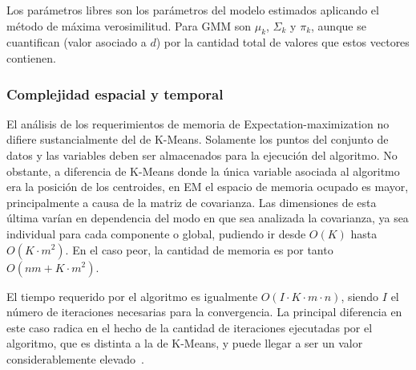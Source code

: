 Los parámetros libres son los parámetros del modelo estimados aplicando el método de máxima verosimilitud.
Para GMM son $\mu_k$, $\Sigma_k$ y $\pi_k$, aunque se cuantifican (valor asociado a $d$) por la cantidad total de valores que estos vectores contienen.

\subsubsection{Complejidad espacial y temporal}

El análisis de los requerimientos de memoria de Expectation-maximization no difiere sustancialmente del de K-Means.
Solamente los puntos del conjunto de datos y las variables deben ser almacenados para la ejecución del algoritmo.
No obstante, a diferencia de K-Means donde la única variable asociada al algoritmo era la posición de los centroides, en EM el espacio de memoria ocupado es mayor, principalmente a causa de la matriz de covarianza.
Las dimensiones de esta última varían en dependencia del modo en que sea analizada la covarianza, ya sea individual para cada componente o global, pudiendo ir desde $O(K)$ hasta $O(K \cdot m^2)$.
En el caso peor, la cantidad de memoria es por tanto $O(nm + K \cdot m^2)$.

El tiempo requerido por el algoritmo es igualmente $O(I\cdot K\cdot m\cdot n)$, siendo $I$ el número de iteraciones necesarias para la convergencia. La principal diferencia en este caso radica en el hecho de la cantidad de iteraciones ejecutadas por el algoritmo, que es distinta a la de K-Means, y puede llegar a ser un valor considerablemente elevado~\cite{Firdaus15,Park09}.

